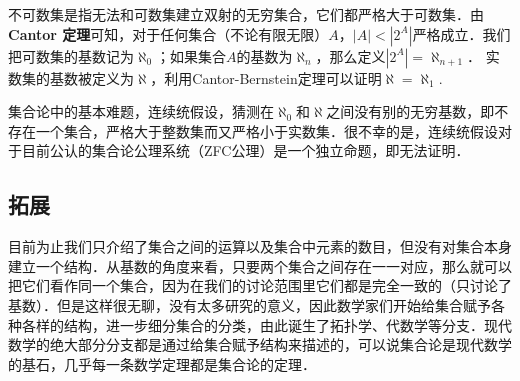 不可数集是指无法和可数集建立双射的无穷集合，它们都严格大于可数集．由 \textbf{Cantor 定理}可知，对于任何集合（不论有限无限）$A$，$|A|<|2^A|$严格成立．我们把可数集的基数记为$\aleph_0$；如果集合$A$的基数为$\aleph_n$，那么定义$|2^A|=\aleph_{n+1}$． 实数集的基数被定义为$\aleph$，利用Cantor-Bernstein定理可以证明$\aleph=\aleph_1$. 

集合论中的基本难题，连续统假设，猜测在$\aleph_0$和$\aleph$之间没有别的无穷基数，即不存在一个集合，严格大于整数集而又严格小于实数集．很不幸的是，连续统假设对于目前公认的集合论公理系统（ZFC公理）是一个独立命题，即无法证明．

\subsection{拓展}
目前为止我们只介绍了集合之间的运算以及集合中元素的数目，但没有对集合本身建立一个结构．从基数的角度来看，只要两个集合之间存在一一对应，那么就可以把它们看作同一个集合，因为在我们的讨论范围里它们都是完全一致的（只讨论了基数）．但是这样很无聊，没有太多研究的意义，因此数学家们开始给集合赋予各种各样的结构，进一步细分集合的分类，由此诞生了拓扑学、代数学等分支．现代数学的绝大部分分支都是通过给集合赋予结构来描述的，可以说集合论是现代数学的基石，几乎每一条数学定理都是集合论的定理．
